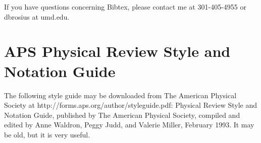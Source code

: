 If you have questions concerning Bibtex, please contact me at 301-405-4955 or dbrosius at umd.edu.


\section{APS Physical Review Style and Notation Guide}

The following style guide may be downloaded from The American Physical Society at http://forms.aps.org/author/styleguide.pdf:  Physical Review Style and Notation Guide, published by The American Physical Society, compiled and edited by Anne Waldron, Peggy Judd, and Valerie Miller, February 1993.  It may be old, but it is very useful.

